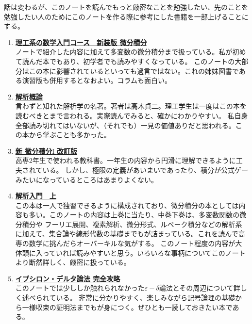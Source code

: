 \documentclass[a4j,dvipdfmx]{jsarticle}
\begin{document}
        話は変わるが、このノートを読んでもっと厳密なことを勉強したい、先のことを勉強したい人のためにこのノートを作る際に参考にした書籍を一部上げることにする。
        \begin{enumerate}\setcounter{enumi}{0}\renewcommand{\labelenumi}{(\arabic{enumi})}
            \item \href{https://www.iwanami.co.jp/book/b482316.html}{\textbf{理工系の数学入門コース　新装版 微分積分}}\\ノートで紹介した内容に加えて多変数の微分積分まで扱っている。私が初めて読んだ本でもあり、初学者でも読みやすくなっている。
            このノートの大部分はこの本に影響されているといっても過言ではない。これの姉妹図書である演習版も併用するとなおよい。コラムも面白い。
            \item \href{https://www.iwanami.co.jp/book/b265489.html}{\textbf{解析概論}}\\言わずと知れた解析学の名著。著者は高木貞二。理工学生は一度はこの本を読むべきとまで言われる。実際読んでみると、確かにわかりやすい。
            私自身全部読み切れてはいないが、（それでも）一見の価値ありだと思われる。この本から学ぶことも多かった。
            \item \href{https://www.dainippon-tosho.co.jp/college_math/differential1.html}{\textbf{新 微分積分}I \textbf{改訂版}}\\高専2年生で使われる教科書。一年生の内容から円滑に理解できるように工夫されている。
            しかし、極限の定義があいまいであったり、積分が公式ゲーみたいになっているところはあまりよくない。
            \item \href{https://www.iwanami.co.jp/book/b378350.html}{\textbf{解析入門　上}}\\この本は一人で独習できるように構成されており、微分積分の本としては内容も多い。このノートの内容は上巻に当たり、中巻下巻は、多変数関数の微分積分や
            フーリエ展開、複素解析、微分形式、ルベーク積分などの解析系に加えて、集合論や線形代数の基礎までもが詰まっている。これを読んで高専の数学に挑んだらオーバーキルな気がする。
            このノート程度の内容が大体頭に入っていれば読みやすいと思う。いろいろな事柄についてこのノートより断然詳しく、厳密に扱っている。
            \item \href{https://www.kyoritsu-pub.co.jp/book/b10008061.html}{\textbf{イプシロン・デルタ論法 完全攻略}}\\このノートでは少ししか触れられなかった$\varepsilon-\delta$論法とその周辺について詳しく述べられている。
            非常に分かりやすく、楽しみながら記号論理の基礎から一様収束の証明法までもが身につく。ぜひとも一読しておきたい本である。

\end{enumerate}
\end{document}
